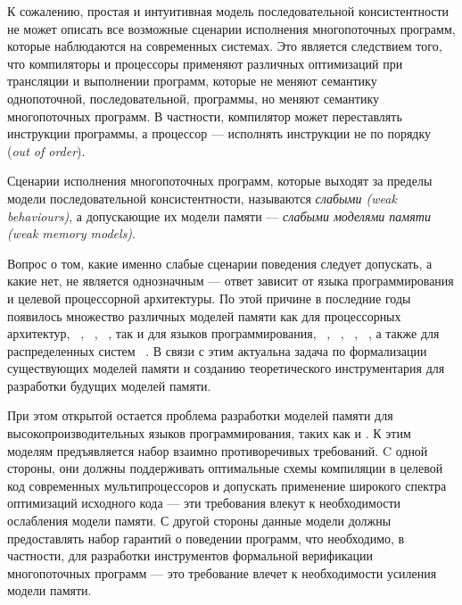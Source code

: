 К сожалению, простая и интуитивная модель последовательной консистентности не может описать все возможные сценарии исполнения
многопоточных программ, которые наблюдаются на современных системах.
Это является следствием того, что компиляторы и процессоры применяют различных оптимизаций
при трансляции и выполнении программ,
которые не меняют семантику однопоточной, последовательной, программы, но меняют семантику многопоточных программ.
В частности, компилятор может переставлять инструкции программы, а процессор --- исполнять инструкции не по порядку (\emph{out of order}).

Сценарии исполнения многопоточных программ, которые выходят за пределы модели последовательной консистентности,
называются \emph{слабыми (weak behaviours)}, а допускающие их модели памяти ---
\emph{слабыми моделями памяти (weak memory models)}.

Вопрос о том, какие именно слабые сценарии поведения 
следует допускать, а какие нет, не является однозначным --- ответ  
зависит от языка программирования и целевой процессорной архитектуры.
По этой причине в последние годы появилось множество
различных моделей памяти как для процессорных архитектур, \Intel~\autocite{Sewell-al:CACM10}, 
\ARM~\autocite{Pulte-al:POPL18}, 
\POWER~\autocite{Sarkar-al:PLDI11}, так и для языков программирования,
\CPP~\autocite{Batty-al:POPL11},
\Java~\autocite{Manson-al:POPL05}, 
\JS~\autocite{Watt-al:PLDI2020}, 
\OCaml~\autocite{Dolan-al:PLDI18},
а также для распределенных систем%
~\autocite{Jagadeesan-al:ESOP2018,Lahav-Boker:PLDI2020}.
В связи с этим актуальна задача по формализации 
существующих моделей памяти и созданию теоретического инструментария
для разработки будущих моделей памяти.

При этом открытой остается проблема разработки моделей памяти
для высокопроизводительных языков программирования, таких как \CPP и \Java.
К этим моделям предъявляется набор взаимно противоречивых требований.
C одной стороны, они должны поддерживать оптимальные схемы компиляции в
целевой код современных мультипроцессоров и допускать применение
широкого спектра оптимизаций исходного кода --- эти требования
влекут к необходимости ослабления модели памяти.
С другой стороны данные модели должны предоставлять набор
гарантий о поведении программ, что необходимо, в частности, для разработки инструментов
формальной верификации многопоточных программ --- это требование
влечет к необходимости усиления модели памяти.

